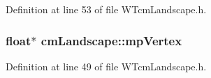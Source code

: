 Definition at line 53 of file WTcmLandscape.h.

\hypertarget{classcm_landscape_ab411ed8b3f9c55c32de92691f1d26719}{
\subsubsection[{mpVertex}]{\setlength{\rightskip}{0pt plus 5cm}float$\ast$ {\bf cmLandscape::mpVertex}}}
\label{classcm_landscape_ab411ed8b3f9c55c32de92691f1d26719}


Definition at line 49 of file WTcmLandscape.h.

